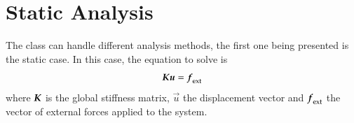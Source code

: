 






\section{Static Analysis\label{sect:smm:static}}

The  class can handle different analysis
methods, the first one being presented is the static case.  In this
case, the equation to solve is
\begin{equation}
  \label{eqn:smm:static} \boldsymbol{K} \boldsymbol{u} =
  \boldsymbol{f}_{{\mathrm{ext}}}
\end{equation}
where $\boldsymbol{K}$ is the global stiffness matrix, $\vec{u}$ the
displacement vector and $\boldsymbol{f}_{{\mathrm{ext}}}$ the vector of external
forces applied to the system.

